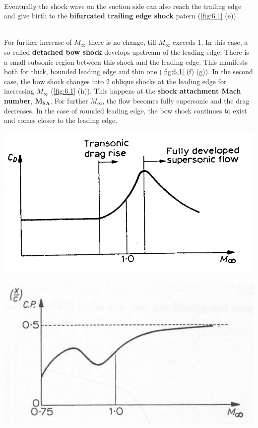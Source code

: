 \documentclass[british,french,11pt, a4paper, openany]{article}
\begin{document}
\ \\ Eventually the shock wave on the suction side can also reach the trailing edge and give birth to the \textbf{bifurcated trailing edge shock} patern (\autoref{fig:6.1} (e)). 

\ \\ For further increase of $M_\infty$ there is no change, till $M_\infty$ exceeds 1. In this case, a so-called \textbf{detached bow shock} develops upstream of the leading edge. There is a small subsonic region between this shock and the leading edge. This manifests both for thick, bounded leading edge and thin one (\autoref{fig:6.1} (f) (g)). In the second case, the bow shock changes into 2 oblique shocks at the leading edge for increasing $M_\infty$ (\autoref{fig:6.1} (h)). This happens at the \textbf{shock attachment Mach number}, $\bm{M_{SA}}$. For further $M_{\infty}$, the flow becomes fully supersonic and the drag decreases. In the case of rounded leading edge, the bow shock continues to exist and comes closer to the leading edge. 

\begin{center}
	\begin{minipage}{0.3\textwidth}
		\includegraphics[scale=0.15]{ch6/2}
		\label{fig:6.2}
	\end{minipage}
	\begin{minipage}{0.3\textwidth}
		\includegraphics[scale=0.15]{ch6/3}
		\label{fig:6.3}
	\end{minipage}
\end{center}
\end{document}
